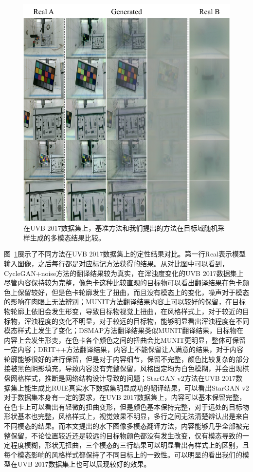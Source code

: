 \begin{figure}
    \centering
	\includegraphics[width=\textwidth]{figures/UVB_random.pdf}
	\caption{在UVB 2017数据集上，基准方法和我们提出的方法在目标域随机采样生成的多模态结果比较。}
	\label{fig:uvb_random}
\end{figure}

图~\ref{fig:uvb_random}展示了不同方法在UVB 2017数据集上的定性结果对比。第一行Real表示模型输入图像，之后每行都是对应标记方法获得的结果。从对比图中可以看到，CycleGAN+noise方法的翻译结果较为真实，在浑浊度变化的UVB 2017数据集上尽管内容保持较为完整，像色卡这种比较直观的目标物可以看出翻译结果在色卡颜色上保留较好，但是色卡轮廓发生了扭曲，而且没有模态上的变化，噪声对于模态的影响在肉眼上无法辨别；MUNIT方法翻译结果内容上可以较好的保留，在目标物轮廓上依旧会发生形变，导致目标物视觉上扭曲，在风格样式上，对于较近的目标物，浑浊程度的变化不明显，对于较远的目标物，能够明显看出浑浊程度在不同模态样式上发生了变化；DSMAP方法翻译结果类似MUNIT翻译结果，目标物在内容上会发生形变，在色卡各个颜色之间的扭曲会比MUNIT更明显，整体可保留一定内容；DRIT++方法翻译结果，内容上不能保留让人满意的结果，对于内容轮廓能够很好的进行保留，但是对于内容细节，保留不完整，颜色比较复杂的部分接被黑色阴影填充，导致内容没有完整保留，风格固定均为白色模糊，并会出现棋盘网格样式，推断是网络结构设计导致的问题；StarGAN v2方法在UVB 2017数据集上能生成比RUIE真实水下数据集明显成功的翻译结果，可以看出StarGAN v2对于数据集本身有一定的要求，在UVB 2017数据集上，内容可以基本保留完整，在色卡上可以看出有轻微的扭曲变形，但是颜色基本保持完整，对于远处的目标物形状基本也完整，风格样式上，视觉效果不明显，多行之间无法清楚辨认出是来自不同模态的结果。而本文提出的水下图像多模态翻译方法，内容能够几乎全部被完整保留，不论位置较近还是较远的目标物颜色都没有发生改变，仅有模态导致的一定程度模糊，形状无扭曲，三个模态的三行结果可以明显看出有样式上的区别，且每个模态影响的风格样式都保持了不同目标上的一致性。可以明显的看出我们的模型在UVB 2017数据集上也可以展现较好的效果。

